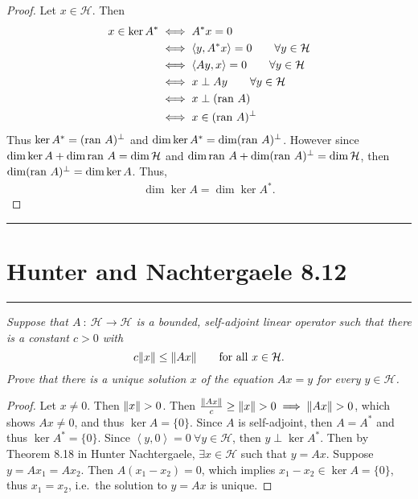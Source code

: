 \documentclass{article} %
\theoremstyle{plain}
\newcommand{\VEC}[2]{\left\langle #1, #2 \right\rangle}
\newcommand{\ran}{\text{\rm ran }}
\newcommand{\problem}[1]{
\vspace{.375cm}
\begin{minipage}{\textwidth}
    \begin{center}
        \noindent\rule{5cm}{1pt}
    \end{center}
    \section{\bf #1}
    \begin{center}
        \noindent\rule{5cm}{1pt}
    \end{center}
    \vspace{0.25cm}
\end{minipage}
}
\numberwithin{equation}{section} %
\numberwithin{figure}{section} %
\numberwithin{table}{section} %
\begin{document}
\begin{proof}
    Let $x \in \mathcal{H}$.  Then
    \begin{align*}
        x \in \ker A^* &\iff A^*x = 0 \\
        &\iff \VEC{y}{A^*x} = 0 \qquad \forall y \in \mathcal{H} \\
        &\iff \VEC{Ay}{x} = 0 \qquad \forall y \in \mathcal{H} \\
        &\iff x \perp Ay \qquad \forall y \in \mathcal{H} \\
        &\iff x \perp (\ran A) \\
        &\iff x \in (\ran A)^\perp
    \end{align*}
    Thus $\ker A^* = (\ran A)^\perp$ and $\dim \ker A^* = \dim (\ran A)^\perp$.  However since $\dim \ker A + \dim \ran A = \dim \mathcal{H}$ and $\dim \ran A + \dim (\ran A)^\perp = \dim \mathcal{H}$, then $\dim (\ran A)^\perp = \dim \ker A$.  Thus,
    \begin{align*}
        \dim \ker A = \dim \ker A^*.
    \end{align*}
\end{proof}










\problem{Hunter and Nachtergaele 8.12}
\emph{Suppose that $A\ :\ \mathcal{H} \rightarrow \mathcal{H}$ is a bounded, self-adjoint linear operator such that there is a constant $c > 0$ with $$c\norm{x} \leq \norm{Ax} \qquad \text{for all } x \in \mathcal{H}.$$  Prove that there is a unique solution $x$ of the equation $Ax = y$ for every $y \in \mathcal{H}$.} \\

\begin{proof}
    Let $x \neq 0$.  Then $\norm{x} > 0$.  Then $\frac{\norm{Ax}}{c} \geq \norm{x} > 0 \implies \norm{Ax} > 0$, which shows $Ax \neq 0$, and thus $\ker A = \{0\}$.  Since $A$ is self-adjoint, then $A = A^*$ and thus $\ker A^* = \{0\}$.  Since $\VEC{y}{0} = 0\ \forall y \in \mathcal{H}$, then $y \perp \ker A^*$.  Then by Theorem 8.18 in Hunter Nachtergaele, $\exists x \in \mathcal{H}$ such that $y = Ax$.  Suppose $y = Ax_1 = Ax_2$.  Then $A(x_1 - x_2) = 0$, which implies $x_1 - x_2 \in \ker A = \{0\}$, thus $x_1 = x_2$, i.e.~the solution to $y = Ax$ is unique.
\end{proof}
\end{document}

